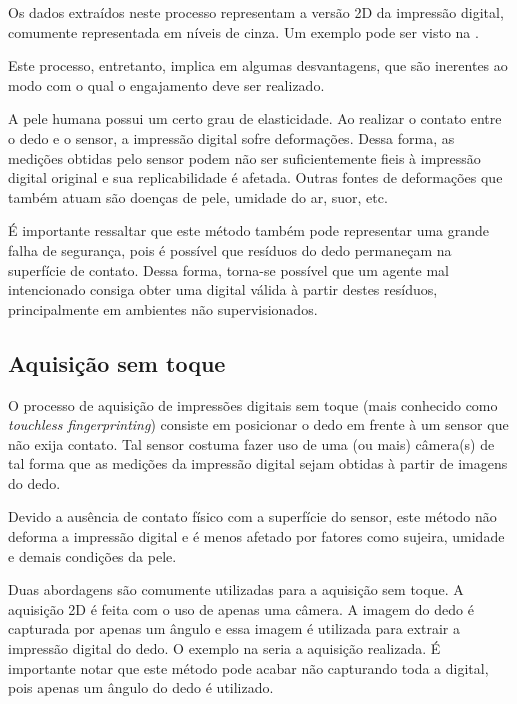 Os dados extraídos neste processo representam a versão 2D da impressão digital, comumente representada em níveis de cinza. Um exemplo pode ser visto na .

%

Este processo, entretanto, implica em algumas desvantagens, que são inerentes ao modo com o qual o engajamento deve ser realizado.

A pele humana possui um certo grau de elasticidade. Ao realizar o contato entre o dedo e o sensor, a impressão digital sofre deformações. Dessa forma, as medições obtidas pelo sensor podem não ser suficientemente fieis à impressão digital original e sua replicabilidade é afetada. Outras fontes de deformações que também atuam são doenças de pele, umidade do ar, suor, etc.

É importante ressaltar que este método também pode representar uma grande falha de segurança, pois é possível que resíduos do dedo permaneçam na superfície de contato. Dessa forma, torna-se possível que um agente mal intencionado consiga obter uma digital válida à partir destes resíduos, principalmente em ambientes não supervisionados.

\subsection{Aquisição sem toque} \label{touchless}
O processo de aquisição de impressões digitais sem toque (mais conhecido como \textit{touchless fingerprinting}) consiste em posicionar o dedo em frente à um sensor que não exija contato. Tal sensor costuma fazer uso de uma (ou mais) câmera(s) de tal forma que as medições da impressão digital sejam obtidas à partir de imagens do dedo.

Devido a ausência de contato físico com a superfície do sensor, este método não deforma a impressão digital e é menos afetado por fatores como sujeira, umidade e demais condições da pele.

Duas abordagens são comumente utilizadas para a aquisição sem toque. A aquisição 2D é feita com o uso de apenas uma câmera. A imagem do dedo é capturada por apenas um ângulo e essa imagem é utilizada para extrair a impressão digital do dedo. O exemplo na  seria a aquisição realizada. É importante notar que este método pode acabar não capturando toda a digital, pois apenas um ângulo do dedo é utilizado.


